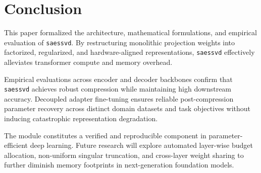\section{Conclusion}
This paper formalized the architecture, mathematical formulations, and empirical evaluation of \texttt{saessvd}. By restructuring monolithic projection weights into factorized, regularized, and hardware-aligned representations, \texttt{saessvd} effectively alleviates transformer compute and memory overhead.

Empirical evaluations across encoder and decoder backbones confirm that \texttt{saessvd} achieves robust compression while maintaining high downstream accuracy. Decoupled adapter fine-tuning ensures reliable post-compression parameter recovery across distinct domain datasets and task objectives without inducing catastrophic representation degradation.

The module constitutes a verified and reproducible component in parameter-efficient deep learning. Future research will explore automated layer-wise budget allocation, non-uniform singular truncation, and cross-layer weight sharing to further diminish memory footprints in next-generation foundation models.
